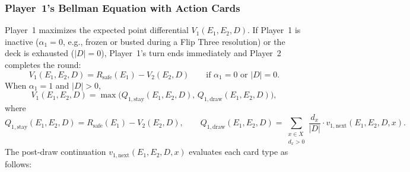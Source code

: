 \documentclass{article}
\theoremstyle{plain}
\theoremstyle{definition}
\theoremstyle{remark}
\begin{document}
\subsubsection{Player~1's Bellman Equation with Action Cards}
Player~1 maximizes the expected point differential $V_1(E_1, E_2, D)$. If Player~1 is inactive ($\alpha_1 = 0$, e.g., frozen or busted during a Flip Three resolution) or the deck is exhausted ($|D| = 0$), Player~1's turn ends immediately and Player~2 completes the round:
\[
    V_1(E_1, E_2, D) = R_{\text{safe}}(E_1) - V_2(E_2, D) \qquad \text{if } \alpha_1 = 0 \text{ or } |D| = 0.
\]
When $\alpha_1 = 1$ and $|D| > 0$,
\[
    V_1(E_1, E_2, D) = \max \Big( Q_{1,\text{stay}}(E_1, E_2, D), \, Q_{1,\text{draw}}(E_1, E_2, D) \Big),
\]
where
\[
    Q_{1,\text{stay}}(E_1, E_2, D) = R_{\text{safe}}(E_1) - V_2(E_2, D), \qquad
    Q_{1,\text{draw}}(E_1, E_2, D) = \sum_{\substack{x \in X \\ d_x > 0}} \frac{d_x}{|D|} \cdot v_{1,\text{next}}(E_1, E_2, D, x).
\]
The post-draw continuation $v_{1,\text{next}}(E_1, E_2, D, x)$ evaluates each card type as follows:
\end{document}
